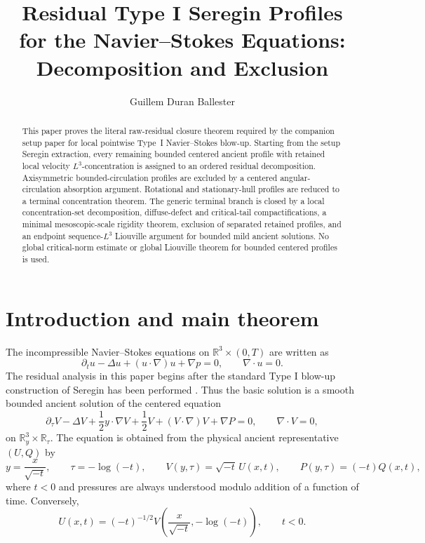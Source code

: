 \documentclass[11pt]{amsart}
\title[Residual Type I Seregin Profiles]
{Residual Type I Seregin Profiles for the Navier--Stokes Equations:
Decomposition and Exclusion}
\author{Guillem Duran Ballester}
\date{}
\numberwithin{equation}{section}
\theoremstyle{plain}
\theoremstyle{definition}
\theoremstyle{remark}
\newcommand{\R}{\mathbb R}
\begin{document}
\raggedbottom

\begin{abstract}
This paper proves the literal raw-residual closure theorem required by the
companion setup paper for local pointwise Type~I Navier--Stokes blow-up.  Starting from
the setup Seregin extraction, every remaining bounded centered ancient profile
with retained local velocity \(L^3\)-concentration is assigned to an ordered
residual decomposition.  Axisymmetric bounded-circulation profiles are excluded
by a centered angular-circulation absorption argument.  Rotational and
stationary-hull profiles are reduced to a terminal concentration theorem.  The
generic terminal branch is closed by a local concentration-set decomposition,
diffuse-defect and critical-tail compactifications, a minimal mesoscopic-scale
rigidity theorem, exclusion of separated retained profiles, and an endpoint
sequence-\(L^3\) Liouville argument for bounded mild ancient solutions.  No
global critical-norm estimate or global Liouville theorem for bounded centered
profiles is used.
\end{abstract}

\maketitle
\tableofcontents

\section{Introduction and main theorem}
\label{sec:introduction}

The incompressible Navier--Stokes equations on
\(\R^3\times(0,T)\) are written as
\begin{equation}\label{eq:NS-physical}
   \partial_tu-\Delta u+(u\cdot\nabla)u+\nabla p=0,
   \qquad \nabla\cdot u=0 .
\end{equation}
The residual analysis in this paper begins after the standard Type I blow-up
construction of Seregin has been performed \cite{Seregin2012}.  Thus the basic solution is a smooth bounded
ancient solution of the centered equation
\begin{equation}\label{eq:centered-main}
   \partial_\tau V-\Delta V+\frac12 y\cdot\nabla V+\frac12 V
   +(V\cdot\nabla)V+\nabla P=0,
   \qquad \nabla\cdot V=0 ,
\end{equation}
on \(\R^3_y\times\R_\tau\).  The equation is obtained from the physical
ancient representative \((U,Q)\) by
\begin{equation}\label{eq:centered-transform}
   y=\frac{x}{\sqrt{-t}},\qquad
   \tau=-\log(-t),\qquad
   V(y,\tau)=\sqrt{-t}\,U(x,t),
   \qquad
   P(y,\tau)=(-t)Q(x,t),
\end{equation}
where \(t<0\) and pressures are always understood modulo addition of a
function of time.  Conversely,
\begin{equation}\label{eq:physical-pullback-main}
   U(x,t)=(-t)^{-1/2}
   V\!\left(\frac{x}{\sqrt{-t}},-\log(-t)\right),
   \qquad t<0 .
\end{equation}
\end{document}

